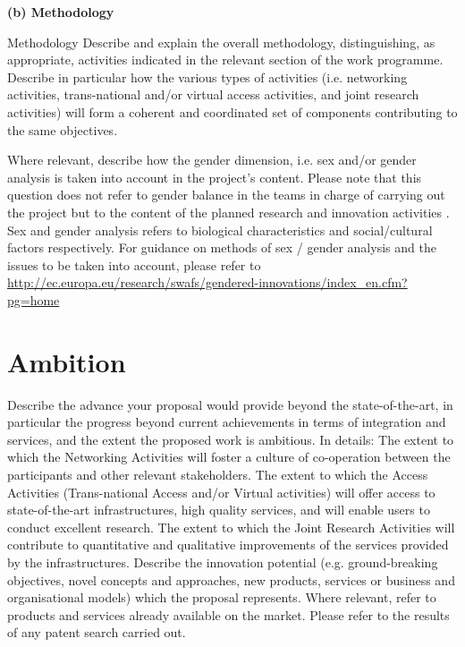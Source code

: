 

{\bf (b) Methodology}

\begin{todo}{Methodology}\color{red}
  Describe and explain the overall methodology, distinguishing, as appropriate, activities indicated in the relevant section of the work programme. Describe in particular how the various types of activities (i.e. networking activities, trans-national and/or virtual access activities, and joint research activities) will form a coherent and coordinated set of components contributing to the same objectives.

  Where relevant, describe how the gender dimension, i.e. sex and/or gender analysis is taken into account in the project’s content.
  Please note that this question does not refer to gender balance in the teams in charge of carrying out the project but to the content of the planned research and innovation activities . Sex and gender analysis refers to biological characteristics and social/cultural factors respectively. For guidance on methods of sex / gender analysis and the issues to be taken into account, please refer to \url{http://ec.europa.eu/research/swafs/gendered-innovations/index_en.cfm?pg=home} 
\end{todo}



\section{Ambition}

\begin{todo}{}\color{red}
  Describe the advance your proposal would provide beyond the state-of-the-art, in particular the progress beyond current achievements in terms of integration and services, and the extent the proposed work is ambitious. In details:
The extent to which the Networking Activities will foster a culture of co-operation between the participants and other relevant stakeholders.
The extent to which the Access Activities (Trans-national Access and/or Virtual activities) will offer access to state-of-the-art infrastructures, high quality services, and will enable users to conduct excellent research.
The extent to which the Joint Research Activities will contribute to quantitative and qualitative improvements of the services provided by the infrastructures.
Describe the innovation potential (e.g. ground-breaking objectives, novel concepts and approaches, new products, services or business and organisational models) which the proposal represents. Where relevant, refer to products and services already available on the market. Please refer to the results of any patent search carried out.
\end{todo}









